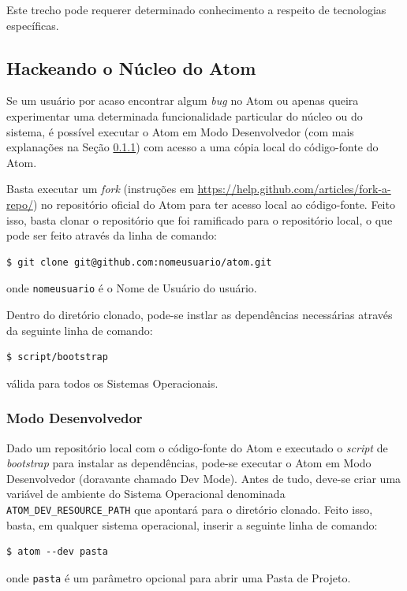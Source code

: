 	Este trecho pode requerer determinado conhecimento a respeito de tecnologias específicas.

	\subsection{Hackeando o Núcleo do Atom} \label{sec:hackingcore}
	Se um usuário por acaso encontrar algum \textit{bug} no Atom ou apenas queira experimentar uma determinada funcionalidade particular do núcleo ou do sistema, é possível executar o Atom em Modo Desenvolvedor (com mais explanações na Seção \ref{sec:dev}) com acesso a uma cópia local do código-fonte do Atom.

	Basta executar um \textit{fork} (instruções em \href{https://help.github.com/articles/fork-a-repo/}{https://help.github.com/articles/fork-a-repo/}) no repositório oficial do Atom para ter acesso local ao código-fonte. Feito isso, basta clonar o repositório que foi ramificado para o repositório local, o que pode ser feito através da linha de comando:
	\begin{Verbatim}[fontsize=\footnotesize]
$ git clone git@github.com:nomeusuario/atom.git
	\end{Verbatim}
	onde \verb|nomeusuario| é o Nome de Usuário do usuário.

	Dentro do diretório clonado, pode-se instlar as dependências necessárias através da seguinte linha de comando:
\begin{Verbatim}[fontsize=\footnotesize]
$ script/bootstrap
\end{Verbatim}
	válida para todos os Sistemas Operacionais.

	\subsubsection{Modo Desenvolvedor}\label{sec:dev}
	Dado um repositório local com o código-fonte do Atom e executado o \textit{script} de \textit{bootstrap} para instalar as dependências, pode-se executar o Atom em Modo Desenvolvedor (doravante chamado Dev Mode). Antes de tudo, deve-se criar uma variável de ambiente do Sistema Operacional denominada \verb|ATOM_DEV_RESOURCE_PATH| que apontará para o diretório clonado. Feito isso, basta, em qualquer sistema operacional, inserir a seguinte linha de comando:
\begin{Verbatim}[fontsize=\footnotesize]
$ atom --dev pasta
\end{Verbatim}
	onde \verb|pasta| é um parâmetro opcional para abrir uma Pasta de Projeto.

